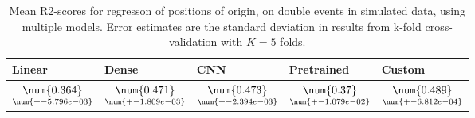 \begin{table}
\centering
\caption{
Mean R2-scores for regresson of positions of origin, on double events in simulated data, using multiple models. 
Error estimates are the standard deviation in results from k-fold cross-validation 
with $K=5$ folds.
}
\label{tab:regression-simulated-double-position-r2}
\begin{tabular}{lllll}
\toprule
                                             Linear &                                               Dense &                                                 CNN &                                         Pretrained &                                              Custom \\
\midrule
 $\underset{\num{+- 5.796e-03 }  }{\num{ 0.364 } }$ &  $\underset{\num{+- 1.809e-03 }  }{\num{ 0.471 } }$ &  $\underset{\num{+- 2.394e-03 }  }{\num{ 0.473 } }$ &  $\underset{\num{+- 1.079e-02 }  }{\num{ 0.37 } }$ &  $\underset{\num{+- 6.812e-04 }  }{\num{ 0.489 } }$ \\
\bottomrule
\end{tabular}
\end{table}
